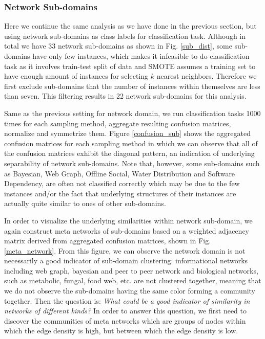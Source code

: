 \documentclass{article}
\begin{document}
\subsubsection{Network Sub-domains}
Here we continue the same analysis as we have done in the previous section, but using network sub-domains as class labels for classification task.
Although in total we have 33 network sub-domains as shown in Fig. \ref{sub_dist}, some sub-domains have only few instances, which makes it infeasible to do classification task as it involves train-test split of data and SMOTE assumes a training set to have enough amount of instances for selecting $k$ nearest neighbors. Therefore we first exclude sub-domains that the number of instances within themselves are less than seven. This filtering results in 22 network sub-domains for this analysis. 

Same as the previous setting for network domain, we run classification tasks 1000 times for each sampling method, aggregate resulting confusion matrices, normalize and symmetrize them. Figure \ref{confusion_sub} shows the aggregated confusion matrices for each sampling method in which we can observe that all of the confusion matrices exhibit the diagonal pattern, an indication of underlying separability of network sub-domains. Note that, however, some sub-domains such as Bayesian, Web Graph, Offline Social, Water Distribution and Software Dependency, are often not classified correctly which may be due to the few instances and/or the fact that underlying structures of their instances are actually quite similar to ones of other sub-domains.

In order to visualize the underlying similarities within network sub-domain, we again construct meta networks of sub-domains based on a weighted adjacency matrix derived from aggregated confusion matrices, shown in Fig.\ref{meta_network}. From this figure, we can observe the network domain is not necessarily a good indicator of sub-domain clustering: informational networks including web graph, bayesian and peer to peer network and biological networks, such as metabolic, fungal, food web, etc. are not clustered together, meaning that we do not observe the sub-domains having the same color forming a community together. Then the question is: \textit{What could be a good indicator of similarity in networks of different kinds?} In order to answer this question, we first need to discover the communities of meta networks which are groups of nodes within which the edge density is high, but between which the edge density is low.
\end{document}
